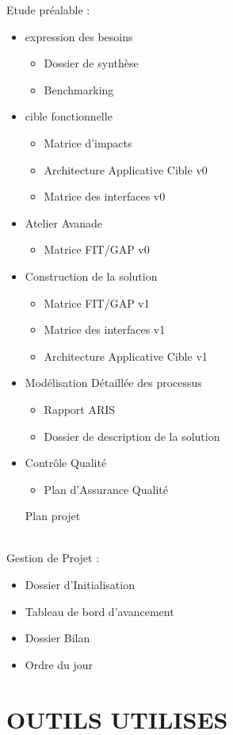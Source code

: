 \documentclass[]{scrartcl}
\begin{document}
Etude préalable : 
\begin{itemize}
\item expression des besoins
\begin{itemize}
\item Dossier de synthèse
\item Benchmarking
\end{itemize}
\item cible fonctionnelle
\begin{itemize}
\item Matrice d'impacts
\item Architecture Applicative Cible v0
\item Matrice des interfaces v0
\end{itemize}
\item Atelier Avanade
\begin{itemize}
\item Matrice FIT/GAP v0
\end{itemize}
\item Construction de la solution
\begin{itemize}
\item Matrice FIT/GAP v1
\item Matrice des interfaces v1
\item Architecture Applicative Cible v1
\end{itemize}
\item Modélisation Détaillée des processus
\begin{itemize}
\item Rapport ARIS
\item Dossier de description de la solution
\end{itemize}
\item Contrôle Qualité
\begin{itemize}
\item Plan d'Assurance Qualité
\end{itemize}
\item [Plan projet]
\end{itemize}
\ \\
Gestion de Projet : 
\begin{itemize}
\item Dossier d'Initialisation
\item Tableau de bord d'avancement
\item Dossier Bilan
\item Ordre du jour
\end{itemize}

\section{OUTILS UTILISES}
\end{document}
